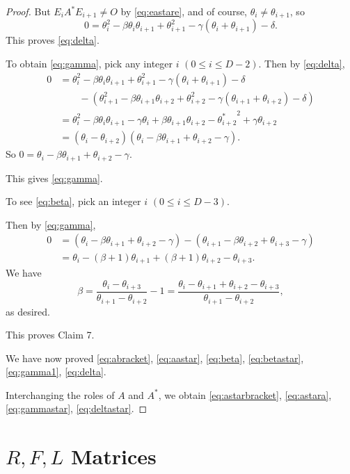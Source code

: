 \documentclass[
]{book}
\theoremstyle{definition}
\theoremstyle{definition}
\theoremstyle{definition}
\theoremstyle{definition}
\theoremstyle{remark}
\begin{document}
\begin{proof}
But \(E_iA^*E_{i+1} \neq O\) by \eqref{eq:eastare}, and of course, \(\theta_i\neq \theta_{i+1}\), so
\[0 = \theta^2_i-\beta\theta_i\theta_{i+1}+\theta_{i+1}^2-\gamma(\theta_i+\theta_{i+1})-\delta.\]
This proves \eqref{eq:delta}.

To obtain \eqref{eq:gamma}, pick any integer \(i\) \((0\leq i\leq D-2)\).
Then by \eqref{eq:delta},
\begin{align}
0 & = \theta^2_i-\beta\theta_i\theta_{i+1}+\theta_{i+1}^2-\gamma(\theta_i+\theta_{i+1})-\delta\\
& \qquad -(\theta^2_{i+1}-\beta\theta_{i+1}\theta_{i+2}+\theta_{i+2}^2-\gamma(\theta_{i+1}+\theta_{i+2})-\delta)\\
& = \theta_i^2 - \beta\theta_i\theta_{i+1}-\gamma\theta_i + \beta\theta_{i+1}\theta_{i+2}-{\theta^*_{i+2}}^2 + \gamma\theta_{i+2}\\
& = (\theta_i-\theta_{i+2})(\theta_i - \beta\theta_{i+1} + \theta_{i+2} - \gamma).
\end{align}
So \(0 = \theta_i - \beta\theta_{i+1} + \theta_{i+2} - \gamma\).

This gives \eqref{eq:gamma}.

To see \eqref{eq:beta}, pick an integer \(i\) \((0\leq i\leq D-3)\).

Then by \eqref{eq:gamma},
\begin{align}
0 & = (\theta_i - \beta\theta_{i+1} + \theta_{i+2} - \gamma) - (\theta_{i+1} - \beta\theta_{i+2} + \theta_{i+3} - \gamma) \\
& = \theta_i-(\beta+1)\theta_{i+1} + (\beta+1)\theta_{i+2} - \theta_{i+3}.
\end{align}
We have
\[\beta = \frac{\theta_i-\theta_{i+3}}{\theta_{i+1}-\theta_{i+2}} - 1 = \frac{\theta_i-\theta_{i+1}+\theta_{i+2}-\theta_{i+3}}{\theta_{i+1}-\theta_{i+2}},\]
as desired.

This proves Claim 7.

We have now proved \eqref{eq:abracket}, \eqref{eq:aastar}, \eqref{eq:beta}, \eqref{eq:betastar}, \eqref{eq:gamma1}, \eqref{eq:delta}.

Interchanging the roles of \(A\) and \(A^*\), we obtain \eqref{eq:astarbracket}, \eqref{eq:astara}, \eqref{eq:gammastar}, \eqref{eq:deltastar}.

\end{proof}

\hypertarget{lec30}{%
\chapter{\texorpdfstring{\(R, F, L\) Matrices}{R, F, L Matrices}}\label{lec30}}
\end{document}
